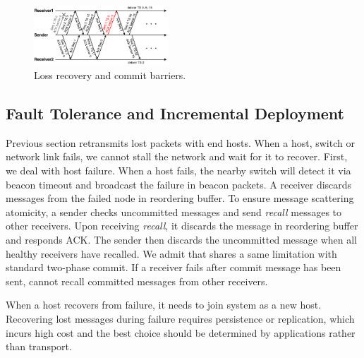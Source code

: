 \begin{figure}[t]
\centering
\includegraphics[width=0.45\textwidth]{images/loss_detection.pdf}
\caption{Loss recovery and commit barriers.}
\label{fig:ack-barrier}
\vspace{-0.4em}
\end{figure}




\subsection{Fault Tolerance and Incremental Deployment}
\label{sec:failure}

Previous section retransmits lost packets with end hosts.
When a host, switch or network link fails, we cannot stall the network and wait for it to recover.
First, we deal with host failure.
When a host fails, the nearby switch will detect it via beacon timeout and broadcast the failure in beacon packets.
A receiver discards messages from the failed node in reordering buffer.
To ensure message scattering atomicity, a sender checks uncommitted messages and send \textit{recall} messages to other receivers.
Upon receiving \textit{recall}, it discards the message in reordering buffer and responds ACK.
The sender then discards the uncommitted message when all healthy receivers have recalled.
We admit that \sys shares a same limitation with standard two-phase commit.
If a receiver fails after commit message has been sent, \sys cannot recall committed messages from other receivers.

When a host recovers from failure, it needs to join \sys system as a new host.
Recovering lost messages during failure requires persistence or replication, which incurs high cost and the best choice should be determined by applications rather than \sys transport.

